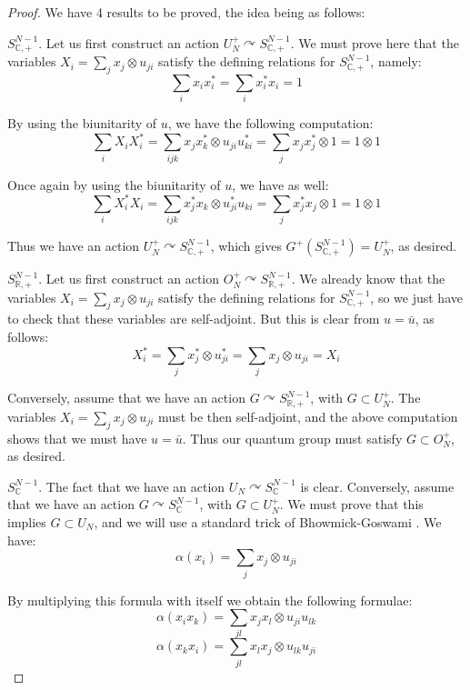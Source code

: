 \documentclass[12pt]{amsbook}
\begin{document}
\begin{proof}
We have 4 results to be proved, the idea being as follows:

\medskip

\underline{$S^{N-1}_{\mathbb C,+}$}. Let us first construct an action $U_N^+\curvearrowright S^{N-1}_{\mathbb C,+}$. We must prove here that the variables $X_i=\sum_jx_j\otimes u_{ji}$ satisfy the defining relations for $S^{N-1}_{\mathbb C,+}$, namely:
$$\sum_ix_ix_i^*=\sum_ix_i^*x_i=1$$

By using the biunitarity of $u$, we have the following computation:
$$\sum_iX_iX_i^*
=\sum_{ijk}x_jx_k^*\otimes u_{ji}u_{ki}^*
=\sum_jx_jx_j^*\otimes1
=1\otimes1$$

Once again by using the biunitarity of $u$, we have as well:
$$\sum_iX_i^*X_i
=\sum_{ijk}x_j^*x_k\otimes u_{ji}^*u_{ki}
=\sum_jx_j^*x_j\otimes1
=1\otimes1$$

Thus we have an action $U_N^+\curvearrowright S^{N-1}_{\mathbb C,+}$, which gives $G^+(S^{N-1}_{\mathbb C,+})=U_N^+$, as desired. 

\medskip

\underline{$S^{N-1}_{\mathbb R,+}$}. Let us first construct an action $O_N^+\curvearrowright S^{N-1}_{\mathbb R,+}$. We already know that the variables $X_i=\sum_jx_j\otimes u_{ji}$ satisfy the defining relations for $S^{N-1}_{\mathbb C,+}$, so we just have to check that these variables are self-adjoint. But this is clear from $u=\bar{u}$, as follows:
$$X_i^*
=\sum_jx_j^*\otimes u_{ji}^*
=\sum_jx_j\otimes u_{ji}
=X_i$$

Conversely, assume that we have an action $G\curvearrowright S^{N-1}_{\mathbb R,+}$, with $G\subset U_N^+$. The variables $X_i=\sum_jx_j\otimes u_{ji}$ must be then self-adjoint, and the above computation shows that we must have $u=\bar{u}$. Thus our quantum group must satisfy $G\subset O_N^+$, as desired.

\medskip

\underline{$S^{N-1}_\mathbb C$}. The fact that we have an action $U_N\curvearrowright S^{N-1}_\mathbb C$ is clear. Conversely, assume that we have an action $G\curvearrowright S^{N-1}_\mathbb C$, with $G\subset U_N^+$. We must prove that this implies $G\subset U_N$, and we will use a standard trick of Bhowmick-Goswami \cite{bgo}. We have:
$$\alpha(x_i)=\sum_jx_j\otimes u_{ji}$$

By multiplying this formula with itself we obtain the following formulae:
$$\alpha(x_ix_k)=\sum_{jl}x_jx_l\otimes u_{ji}u_{lk}$$
$$\alpha(x_kx_i)=\sum_{jl}x_lx_j\otimes u_{lk}u_{ji}$$


\end{proof}
\end{document}
